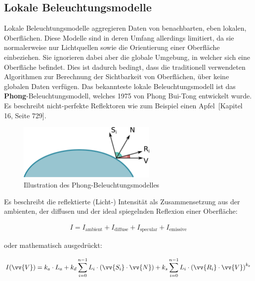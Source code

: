 \subsection{Lokale Beleuchtungsmodelle}
\label{subsec:local_illumination_models}

Lokale Beleuchtungsmodelle aggregieren Daten von benachbarten, eben lokalen,
Oberflächen. Diese Modelle sind in deren Umfang allerdings limitiert, da sie
normalerweise nur Lichtquellen sowie die Orientierung einer Oberfläche
einbeziehen. Sie ignorieren dabei aber die globale Umgebung, in welcher sich
eine Oberfläche befindet.  Dies ist dadurch bedingt, dass die traditionell
verwendeten Algorithmen zur Berechnung der Sichtbarkeit von Oberflächen, über
keine globalen Daten verfügen. Das bekannteste lokale Beleuchtungsmodell ist
das \textbf{Phong}-Beleuchtungsmodell, welches 1975 von Phong Bui-Tong
entwickelt wurde. Es beschreibt nicht-perfekte Reflektoren wie zum Beispiel einen
Apfel~\cite{foley_computer_1996}[Kapitel 16, Seite 729].

\begin{figure}[H]
    \centering
    \includegraphics[width=0.6\textwidth]{img/phong_illumination_model.pdf}
    \caption{Illustration des Phong-Beleuchtungsmodelles\protect\footnotemark}\label{fig:phong_illustration}
\end{figure}

Es beschreibt die reflektierte (Licht-) Intensität als Zusammensetzung aus der ambienten, der diffusen und der ideal spiegelnden Reflexion einer Oberfläche:

\begin{gather}
    I = I_{\text{ambient}} + I_{\text{diffuse}} + I_{\text{specular}} + I_{\text{emissive}}
\end{gather}

oder mathematisch ausgedrückt:

\begin{gather}
    I(\vv{V}) = k_{a} \cdot L_{a} +
                k_{d} \displaystyle\sum_{i=0}^{n - 1} L_{i} \cdot (\vv{S_{i}} \cdot \vv{N}) +
                k_{s} \displaystyle\sum_{i=0}^{n - 1} L_{i} \cdot {(\vv{R_{i}} \cdot \vv{V})}^{k_{e}}
\end{gather}

